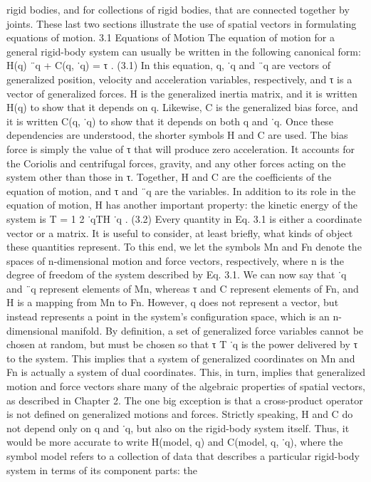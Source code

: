 rigid bodies, and for collections of rigid bodies, that are connected together by joints. These last two sections illustrate the use of spatial vectors in formulating equations of motion. 3.1 Equations of Motion The equation of motion for a general rigid-body system can usually be written in the following canonical form: H(q) ¨q + C(q, ˙q) = τ . (3.1) In this equation, q, ˙q and ¨q are vectors of generalized position, velocity and acceleration variables, respectively, and τ is a vector of generalized forces. H is the generalized inertia matrix, and it is written H(q) to show that it depends on q. Likewise, C is the generalized bias force, and it is written C(q, ˙q) to show that it depends on both q and ˙q. Once these dependencies are understood, the shorter symbols H and C are used. The bias force is simply the value of τ that will produce zero acceleration. It accounts for the Coriolis and centrifugal forces, gravity, and any other forces acting on the system other than those in τ. Together, H and C are the coefficients of the equation of motion, and τ and ¨q are the variables. In addition to its role in the equation of motion, H has another important property: the kinetic energy of the system is T = 1 2 ˙qTH ˙q . (3.2) Every quantity in Eq. 3.1 is either a coordinate vector or a matrix. It is useful to consider, at least briefly, what kinds of object these quantities represent. To this end, we let the symbols Mn and Fn denote the spaces of n-dimensional motion and force vectors, respectively, where n is the degree of freedom of the system described by Eq. 3.1. We can now say that ˙q and ¨q represent elements of Mn, whereas τ and C represent elements of Fn, and H is a mapping from Mn to Fn. However, q does not represent a vector, but instead represents a point in the system’s configuration space, which is an n-dimensional manifold. By definition, a set of generalized force variables cannot be chosen at random, but must be chosen so that τ T ˙q is the power delivered by τ to the system. This implies that a system of generalized coordinates on Mn and Fn is actually a system of dual coordinates. This, in turn, implies that generalized motion and force vectors share many of the algebraic properties of spatial vectors, as described in Chapter 2. The one big exception is that a cross-product operator is not defined on generalized motions and forces. Strictly speaking, H and C do not depend only on q and ˙q, but also on the rigid-body system itself. Thus, it would be more accurate to write H(model, q) and C(model, q, ˙q), where the symbol model refers to a collection of data that describes a particular rigid-body system in terms of its component parts: the

